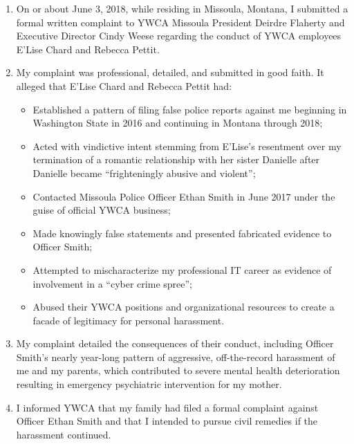 \documentclass[12pt,letterpaper]{article}
\begin{document}
\begin{enumerate}

\item On or about June 3, 2018, while residing in Missoula, Montana, I submitted a formal written complaint to YWCA Missoula President Deirdre Flaherty and Executive Director Cindy Weese regarding the conduct of YWCA employees E'Lise Chard and Rebecca Pettit.

\item My complaint was professional, detailed, and submitted in good faith. It alleged that E'Lise Chard and Rebecca Pettit had:

\begin{itemize}
\item Established a pattern of filing false police reports against me beginning in Washington State in 2016 and continuing in Montana through 2018;

\item Acted with vindictive intent stemming from E'Lise's resentment over my termination of a romantic relationship with her sister Danielle after Danielle became ``frighteningly abusive and violent'';

\item Contacted Missoula Police Officer Ethan Smith in June 2017 under the guise of official YWCA business;

\item Made knowingly false statements and presented fabricated evidence to Officer Smith;

\item Attempted to mischaracterize my professional IT career as evidence of involvement in a ``cyber crime spree'';

\item Abused their YWCA positions and organizational resources to create a facade of legitimacy for personal harassment.
\end{itemize}

\item My complaint detailed the consequences of their conduct, including Officer Smith's nearly year-long pattern of aggressive, off-the-record harassment of me and my parents, which contributed to severe mental health deterioration resulting in emergency psychiatric intervention for my mother.

\item I informed YWCA that my family had filed a formal complaint against Officer Ethan Smith and that I intended to pursue civil remedies if the harassment continued.


\end{enumerate}
\end{document}
